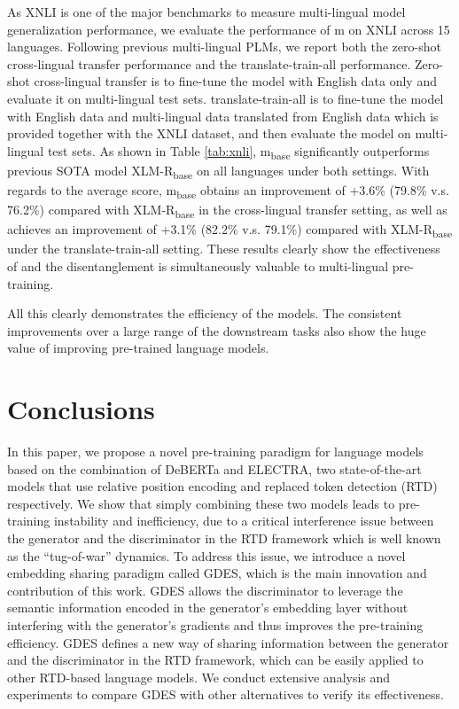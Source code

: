 As XNLI is one of the major benchmarks to measure multi-lingual model generalization performance, we evaluate the performance of m{\ModelName} on XNLI across 15 languages. Following previous multi-lingual PLMs, we report both the zero-shot cross-lingual transfer performance and the translate-train-all performance. Zero-shot cross-lingual transfer is to fine-tune the model with English data only and evaluate it on multi-lingual test sets. translate-train-all is to fine-tune the model with English data and multi-lingual data translated from English data which is provided together with the XNLI dataset\citep{conneau2018xnli}, and then evaluate the model on multi-lingual test sets. As shown in Table \ref{tab:xnli}, m{\ModelName}\textsubscript{base} significantly outperforms previous SOTA model XLM-R\textsubscript{base} on all languages under both settings. With regards to the average score, m{\ModelName}\textsubscript{base} obtains an improvement of +3.6\% (79.8\% v.s. 76.2\%) compared with XLM-R\textsubscript{base} in the cross-lingual transfer setting, as well as achieves an improvement of +3.1\% (82.2\% v.s. 79.1\%) compared with XLM-R\textsubscript{base} under the translate-train-all setting. These results clearly show the effectiveness of {\ModelName} and the disentanglement is simultaneously valuable to multi-lingual pre-training.

All this clearly demonstrates the efficiency of the {\ModelName} models. The consistent improvements over a large range of the downstream tasks also show the huge value of improving pre-trained language models.

\section{Conclusions}
\label{sec:conclusion}

In this paper, we propose a novel pre-training paradigm for language models based on the combination of DeBERTa and ELECTRA, two state-of-the-art models that use relative position encoding and replaced token detection (RTD) respectively. We show that simply combining these two models leads to pre-training instability and inefficiency, due to a critical interference issue between the generator and the discriminator in the RTD framework which is well known as the ``tug-of-war'' dynamics. To address this issue, we introduce a novel embedding sharing paradigm called GDES, which is the main innovation and contribution of this work. GDES allows the discriminator to leverage the semantic information encoded in the generator's embedding layer without interfering with the generator's gradients and thus improves the pre-training efficiency. GDES defines a new way of sharing information between the generator and the discriminator in the RTD framework, which can be easily applied to other RTD-based language models. We conduct extensive analysis and experiments to compare GDES with other alternatives to verify its effectiveness.

